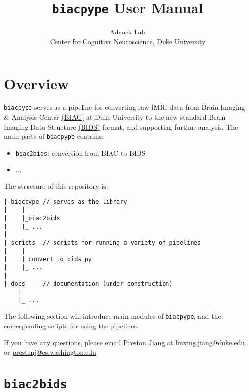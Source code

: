 \documentclass[12pt]{myland}
\begin{document}
\title{\texttt{biacpype} User Manual}
\author{\small{Adcock Lab} \\ \small{Center for Cognitive Neuroscience, Duke University}}
\maketitle
\tableofcontents
\newpage

\section{Overview}

    \texttt{biacpype} serves as a pipeline for converting raw fMRI data from Brain Imaging \& Analysis Center
    \href{https://www.biac.duke.edu/}{(BIAC)} at Duke University to the new standard Brain Imaging Data Structure
    \href{http://bids.neuroimaging.io/}{(BIDS)} format, and supporting furthur analysis. The main parts of
    \texttt{biacpype} contains:

    \begin{itemize}
        \item \texttt{biac2bids}: conversion from BIAC to BIDS
        \item ...
    \end{itemize}

    The structure of this repository is: \par \vspace{.2in}

    \begin{lstlisting}
|-biacpype // serves as the library
|    |
|    |_biac2bids
|    |_ ...
|
|-scripts  // scripts for running a variety of pipelines
|    |
|    |_convert_to_bids.py
|    |_ ...
|
|-docs     // documentation (under construction)
    |
    |_ ...
    \end{lstlisting}

    The following section will introduce main modules of \texttt{biacpype}, and the corresponding scripts for using
    the pipelines. \par

    If you have any questions, please email Preston Jiang at \href{mailto:linxing.jiang@duke.edu}{linxing.jiang@duke.edu}
    or \href{mailto:prestonj@cs.washington.edu}{prestonj@cs.washington.edu}  \par

\section{\texttt{biac2bids}}
\end{document}
